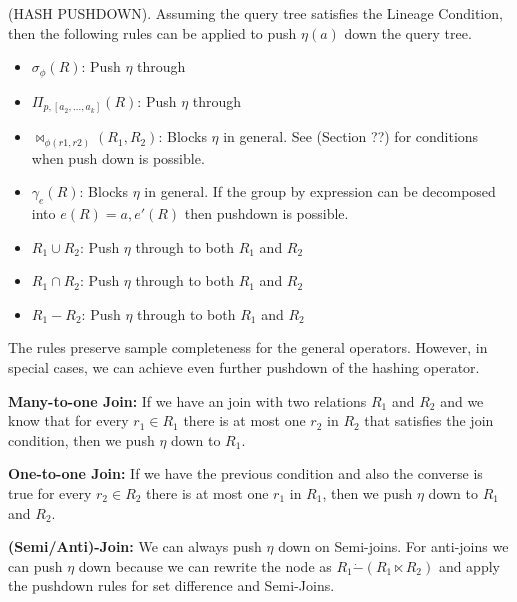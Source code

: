 \begin{proposition}
(HASH PUSHDOWN). Assuming the query tree satisfies the Lineage Condition, then the following rules can be applied to push $\eta(a)$ down the query tree. 
\begin{itemize}\vspace{-.45em}
\item $\sigma_{\phi}(R)$: Push $\eta$ through \vspace{-.45em}
\item $\Pi_{p,[a_2,...,a_k]}(R)$: Push $\eta $ through \vspace{-.45em}
\item $\bowtie_{\phi (r1,r2)}(R_1,R_2)$: Blocks $\eta $ in general. See (Section ??) for conditions when push down is possible.
\item $\gamma_{e}(R)$: Blocks $\eta$ in general. If the group by expression can be decomposed into $e(R) = a, e'(R)$ then pushdown is possible.\vspace{-.45em}
\item $R_1 \cup R_2$: Push $\eta $ through to both $R_1$ and $R_2$
\item $R_1 \cap R_2$: Push $\eta $ through to both $R_1$ and $R_2$
\item $R_1 - R_2$: Push $\eta $ through to both $R_1$ and $R_2$
\end{itemize}
\end{proposition}

The rules preserve sample completeness for the general operators. 
However, in special cases, we can achieve even further pushdown of the hashing operator. 

\textbf{Many-to-one Join: } If we have an join with two relations $R_1$ and $R_2$ and we know that for every $r_1 \in R_1$ there is at most one $r_2$ in $R_2$ that satisfies the join condition, then we push $\eta$ down to $R_1$.

\textbf{One-to-one Join: } If we have the previous condition and also the converse is true for every $r_2 \in R_2$ there is at most one $r_1$ in $R_1$, then we push $\eta$ down to $R_1$ and $R_2$.

\textbf{(Semi/Anti)-Join: } We can always push $\eta$ down on Semi-joins. For anti-joins we can push $\eta$ down because we can rewrite the node as $R_1 \dot{-} (R_1 \ltimes R_2) $ and apply the pushdown rules for set difference and Semi-Joins.

